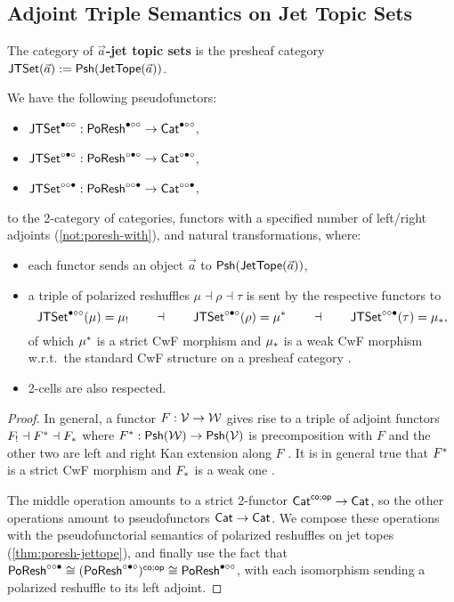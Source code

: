 \documentclass[a4paper]{memoir}
\begin{document}
\subsection{Adjoint Triple Semantics on Jet Topic Sets} \label{sec:poresh-jtset:triple}
\begin{definition}
	The category of \textbf{$\vec a$-jet topic sets} is the presheaf category $\mathsf{JTSet}(\vec a) := {\mathsf{Psh}}(\mathsf{JetTope}(\vec a))$.
\end{definition}
\begin{theorem} \label{thm:poresh-jtset:triple}
	We have the following pseudofunctors:
	\begin{itemize}
		\item $\mathsf{JTSet}^{\bullet \circ \circ} : \mathsf{PoResh}^{\bullet \circ \circ} \to {\mathsf{Cat}}^{\bullet \circ \circ}$,
		\item $\mathsf{JTSet}^{\circ \bullet \circ} : \mathsf{PoResh}^{\circ \bullet \circ} \to {\mathsf{Cat}}^{\circ \bullet \circ}$,
		\item $\mathsf{JTSet}^{\circ \circ \bullet} : \mathsf{PoResh}^{\circ \circ \bullet} \to {\mathsf{Cat}}^{\circ \circ \bullet}$,
	\end{itemize}
	to the 2-category of categories, functors with a specified number of left/right adjoints (\cref{not:poresh-with}), and natural transformations, where:
	\begin{itemize}
		\item each functor sends an object $\vec a$ to ${\mathsf{Psh}}(\mathsf{JetTope}(\vec a))$,
		\item a triple of polarized reshuffles $\mu \dashv \rho \dashv \tau$ is sent by the respective functors to
		\[
			\mathsf{JTSet}^{\bullet \circ \circ}(\mu) = {\mu}_!
			\qquad\dashv\qquad
			\mathsf{JTSet}^{\circ \bullet \circ}(\rho) = {\mu}^*
			\qquad\dashv\qquad
			\mathsf{JTSet}^{\circ \circ \bullet}(\tau) = {\mu}_*,
		\]
		of which ${\mu}^*$ is a strict CwF morphism \cite{dybjer-cwf} and ${\mu}_*$ is a weak CwF morphism \cite[def.\ 2.1.1]{reldtt-techreport}\cite[def.\ 3.2.5]{nuyts-phd} w.r.t.\ the standard CwF structure on a presheaf category \cite[ch.\ 4]{Hofmann97}\cite[\S 4.1]{nuyts-phd}.
		\item 2-cells are also respected.
	\end{itemize}
\end{theorem}
\begin{proof}
	In general, a functor $F : {\mathcal{V}} \to {\mathcal{W}}$ gives rise to a triple of adjoint functors ${F}_! \dashv {F}^* \dashv {F}_*$ where ${F}^* : {\mathsf{Psh}}({\mathcal{W}}) \to {\mathsf{Psh}}({\mathcal{V}})$ is precomposition with $F$ and the other two are left and right Kan extension along $F$ \cite{stacks-adjoints,nlab:lifting-functors}\cite[\S 2.3.8]{nuyts-phd}.
	It is in general true that ${F}^*$ is a strict CwF morphism and ${F}_*$ is a weak one \cite[thm.\ 2.2.1 \& prop.\ 2.2.9]{reldtt-techreport}\cite[\S 6.4]{nuyts-phd}.
	
	The middle operation amounts to a strict 2-functor ${\mathsf{Cat}}^{\mathsf{co};\mathsf{op}} \to {\mathsf{Cat}}$, so the other operations amount to pseudofunctors ${\mathsf{Cat}} \to {\mathsf{Cat}}$.
	We compose these operations with the pseudofunctorial semantics of polarized reshuffles on jet topes (\cref{thm:poresh-jettope}), and finally use the fact that $\mathsf{PoResh}^{\circ \circ \bullet} \cong (\mathsf{PoResh}^{\circ \bullet \circ})^{\mathsf{co};\mathsf{op}} \cong \mathsf{PoResh}^{\bullet \circ \circ}$, with each isomorphism sending a polarized reshuffle to its left adjoint.
\end{proof}
\end{document}
